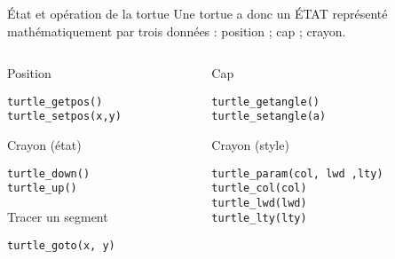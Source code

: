 \documentclass[10pt]{beamer}
\begin{document}
\begin{frame}[fragile]{État et opération de la tortue}
  Une tortue a donc un ÉTAT représenté mathématiquement par trois données : position ; cap ; crayon.


\begin{columns}[t]
\begin{column}{0.48\textwidth}
  \begin{block}{Position}
    \begin{lstlisting}[style=edblock]
turtle_getpos()
turtle_setpos(x,y)
\end{lstlisting}
  \end{block}

\begin{block}{Crayon (état)}
    \begin{lstlisting}[style=edblock]
turtle_down()
turtle_up()
\end{lstlisting}
\end{block}

\begin{alertblock}{Tracer un segment}
    \begin{lstlisting}[style=edblock]
turtle_goto(x, y)
\end{lstlisting}
\end{alertblock}

\end{column}
\begin{column}{0.48\textwidth}
  \begin{block}{Cap}
    \begin{lstlisting}[style=edblock]
turtle_getangle()
turtle_setangle(a)
    \end{lstlisting}
  \end{block}

\begin{block}{Crayon (style)}
    \begin{lstlisting}[style=edblock]
turtle_param(col, lwd ,lty)
turtle_col(col)
turtle_lwd(lwd)
turtle_lty(lty)
\end{lstlisting}
\end{block}
\end{column}
\end{columns}

\end{frame}
\end{document}
